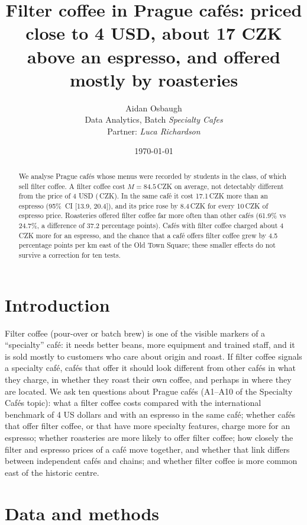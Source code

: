 \documentclass[11pt,a4paper]{article}
\title{\textbf{Filter coffee in Prague caf\'es: priced close to 4 USD, about 17 CZK above an espresso, and offered mostly by roasteries}}
\author{Aidan Osbaugh\\[0.2em]
  {\small Data Analytics, Batch \textit{Specialty Cafes}}\\
  {\small Partner: \textit{Luca Richardson}}}
\date{\today}
\begin{document}
\maketitle

\begin{abstract}
\noindent
We analyse \Nall{} Prague caf\'es whose menus were recorded by students in the class, \Nfilter{} of which sell filter coffee. A filter coffee cost $M = 84.5$\,CZK on average, not detectably different from the price of 4 USD (\BenchCZK\,CZK). In the same caf\'e it cost 17.1\,CZK more than an espresso (95\%~CI [13.9, 20.4]), and its price rose by 8.4\,CZK for every 10\,CZK of espresso price. Roasteries offered filter coffee far more often than other caf\'es (61.9\% vs 24.7\%, a difference of 37.2 percentage points). Caf\'es with filter coffee charged about 4\,CZK more for an espresso, and the chance that a caf\'e offers filter coffee grew by 4.5 percentage points per km east of the Old Town Square; these smaller effects do not survive a correction for ten tests.
\end{abstract}

\section{Introduction}

Filter coffee (pour-over or batch brew) is one of the visible markers of a ``specialty'' caf\'e: it needs better beans, more equipment and trained staff, and it is sold mostly to customers who care about origin and roast. If filter coffee signals a specialty caf\'e, caf\'es that offer it should look different from other caf\'es in what they charge, in whether they roast their own coffee, and perhaps in where they are located. We ask ten questions about Prague caf\'es (A1--A10 of the Specialty Caf\'es topic): what a filter coffee costs compared with the international benchmark of 4 US dollars and with an espresso in the same caf\'e; whether caf\'es that offer filter coffee, or that have more specialty features, charge more for an espresso; whether roasteries are more likely to offer filter coffee; how closely the filter and espresso prices of a caf\'e move together, and whether that link differs between independent caf\'es and chains; and whether filter coffee is more common east of the historic centre.

\section{Data and methods}
\end{document}
